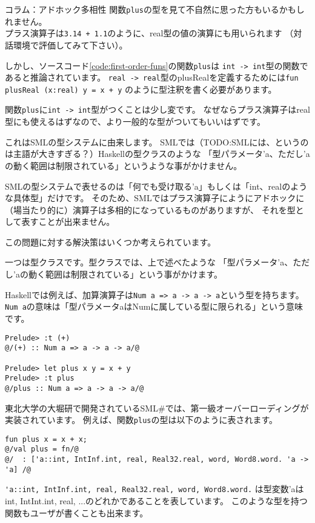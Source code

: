 \documentclass[11pt,a4paper]{article}
\begin{document}
\begin{itembox}[l]{コラム：アドホック多相性}
関数\lstinline{plus}の型を見て不自然に思った方もいるかもしれません。\\
プラス演算子は\lstinline{3.14 + 1.1}のように、real型の値の演算にも用いられます
（対話環境で評価してみて下さい）。

しかし、ソースコード\ref{code:first-order-funs}の関数\lstinline{plus}は
\lstinline{int -> int}型の関数であると推論されています。
\lstinline{real -> real}型のplusRealを定義するためには\lstinline{fun plusReal (x:real) y = x + y}
のように型注釈を書く必要があります。

\vspace{0.3cm}

関数\lstinline{plus}に\lstinline{int -> int}型がつくことは少し変です。
なぜならプラス演算子はreal型にも使えるはずなので、より一般的な型がついてもいいはずです。

これはSMLの型システムに由来します。
SMLでは（TODO:SMLには、というのは主語が大きすぎる？）Haskellの型クラスのような
「型パラメータ'a、ただし'aの動く範囲は制限されている」というような事がかけません。

SMLの型システムで表せるのは「何でも受け取る'a」もしくは「int、realのような具体型」だけです。
そのため、SMLではプラス演算子にようにアドホックに（場当たり的に）演算子は多相的になっているものがありますが、
それを型として表すことが出来ません。

\vspace{0.3cm}

この問題に対する解決策はいくつか考えられています。

一つは型クラスです。型クラスでは、上で述べたような
「型パラメータ'a、ただし'aの動く範囲は制限されている」という事がかけます。

Haskellでは例えば、加算演算子は\lstinline{Num a => a -> a -> a}という型を持ちます。
\lstinline{Num a}の意味は「型パラメータaはNumに属している型に限られる」という意味です。

\begin{lstlisting}[caption=Haskellでのplusの型付け]
Prelude> :t (+)
@/(+) :: Num a => a -> a -> a/@

Prelude> let plus x y = x + y
Prelude> :t plus
@/plus :: Num a => a -> a -> a/@
\end{lstlisting}

東北大学の大堀研で開発されているSML\#\cite{smlsharp}では、第一級オーバーローディングが実装されています。
例えば、関数\lstinline{plus}の型は以下のように表されます。
\begin{lstlisting}[caption=SML\#でのplusの型付け]
fun plus x = x + x;
@/val plus = fn/@
@/  : ['a::int, IntInf.int, real, Real32.real, word, Word8.word. 'a -> 'a] /@
\end{lstlisting}
\lstinline{'a::int, IntInf.int, real, Real32.real, word, Word8.word.}
は型変数'aはint, IntInt.int, real, ...のどれかであることを表しています。
このような型を持つ関数もユーザが書くことも出来ます。


\end{itembox}
\end{document}

